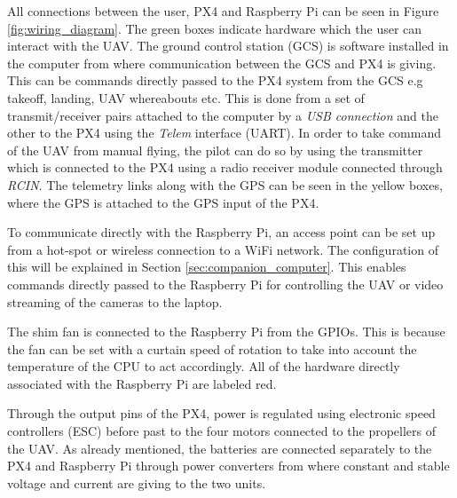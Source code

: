 \documentclass[../Head/report.tex]{subfiles}
\begin{document}
All connections between the user, PX4 and Raspberry Pi can be seen in Figure \ref{fig:wiring_diagram}. The green boxes indicate hardware which the user can interact with the UAV. The ground control station (GCS) is software installed in the computer from where communication between the GCS and PX4 is giving. This can be commands directly passed to the PX4 system from the GCS e.g takeoff, landing, UAV whereabouts etc. This is done from a set of transmit/receiver pairs attached to the computer by a \textit{USB connection} and the other to the PX4 using the \textit{Telem} interface (UART). In order to take command of the UAV from manual flying, the pilot can do so by using the transmitter which is connected to the PX4 using a radio receiver module connected through \textit{RCIN}. The telemetry links along with the GPS can be seen in the yellow boxes, where the GPS is attached to the GPS input of the PX4. 

To communicate directly with the Raspberry Pi, an access point can be set up from a hot-spot or wireless connection to a WiFi network. The configuration of this will be explained in Section \ref{sec:companion_computer}. This enables commands directly passed to the Raspberry Pi for controlling the UAV or video streaming of the cameras to the laptop.

The shim fan is connected to the Raspberry Pi from the GPIOs. This is because the fan can be set with a curtain speed of rotation to take into account the temperature of the CPU to act accordingly. All of the hardware directly associated with the Raspberry Pi are labeled red.  

Through the output pins of the PX4, power is regulated using electronic speed controllers (ESC) before past to the four motors connected to the propellers of the UAV. As already mentioned, the batteries are connected separately to the PX4 and Raspberry Pi through power converters from where constant and stable voltage and current are giving to the two units.   
\end{document}
